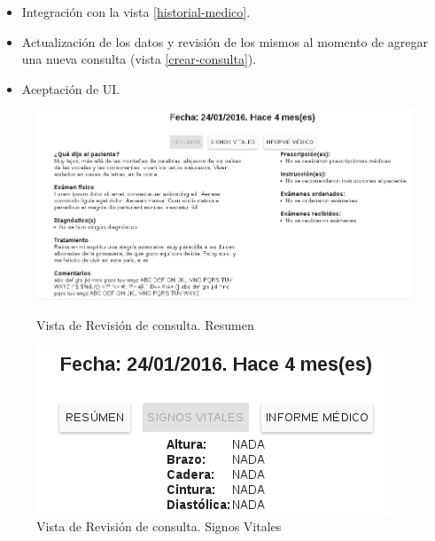     \begin{itemize}
        \item Integración con la vista \ref{historial-medico}.
        \item Actualización de los datos y revisión de los mismos al momento de agregar una nueva consulta (vista \ref{crear-consulta}).
        \item Aceptación de UI.
    \end{itemize}
    
    \begin{figure}[htb!]
        \begin{center}
            \begin{minipage}{0.45\textwidth}
                \begin{center}
                    \includegraphics[width=\linewidth,keepaspectratio=true]{figures/consultarev-resumen}
                \end{center}
                \caption{Vista de Revisión de consulta. Resumen}
                \label{consultarev-resumen}
            \end{minipage}
            \hspace*{\fill}
            \begin{minipage}{0.45\textwidth}
                \begin{center}
                    \includegraphics[width=\linewidth,keepaspectratio=true]{figures/consultarev-signosv}
                \end{center}
                \caption{Vista de Revisión de consulta. Signos Vitales}
                \label{consultarev-signosv}
            \end{minipage}
        \end{center}
    \end{figure}
    
